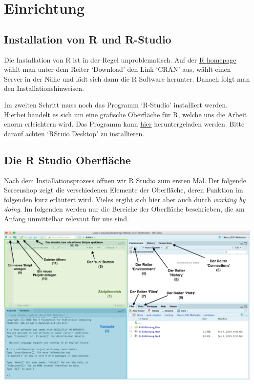 \documentclass[]{book}
\begin{document}
\chapter{Einrichtung}\label{einrichtung}

\section{Installation von R und
R-Studio}\label{installation-von-r-und-r-studio}

Die Installation von R ist in der Regel unproblematisch. Auf der
\href{https://www.r-project.org/}{R homepage} wählt man unter dem Reiter
`Download' den Link `CRAN' aus, wählt einen Server in der Nähe und lädt
sich dann die R Software herunter. Danach folgt man den
Installationshinweisen.

Im zweiten Schritt muss noch das Programm `R-Studio' installiert werden.
Hierbei handelt es sich um eine grafische Oberfläche für R, welche uns
die Arbeit enorm erleichtern wird. Das Programm kann
\href{https://www.rstudio.com/products/rstudio/download/}{hier}
heruntergeladen werden. Bitte darauf achten `RStuio Desktop' zu
installieren.

\section{Die R Studio Oberfläche}\label{die-r-studio-oberflache}

Nach dem Installationsprozess öffnen wir R Studio zum ersten Mal. Der
folgende Screenshop zeigt die verschiedenen Elemente der Oberfläche,
deren Funktion im folgenden kurz erläutert wird. Vieles ergibt sich hier
aber auch durch \emph{working by doing}. Im folgenden werden nur die
Bereiche der Oberfläche beschrieben, die am Anfang unmittelbar relevant
für uns sind.

\begin{center}\includegraphics[width=1\linewidth]{figures/r-studio-light-marked} \end{center}
\end{document}
